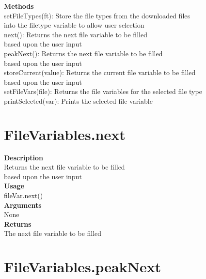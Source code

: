 \documentclass[11pt, oneside]{article}
\begin{document}
\noindent\textbf{Methods} \\
        setFileTypes(ft): Store the file types from the downloaded files\\
            into the filetype variable to allow user selection\\
        next(): Returns the next file variable to be filled\\
            based upon the user input\\
        peakNext(): Returns the next file variable to be filled\\
            based upon the user input\\
        storeCurrent(value): Returns the current file variable to be filled\\
            based upon the user input\\
        setFileVars(file): Returns the file variables for the selected file type\\
        printSelected(var): Prints the selected file variable\\


\section{FileVariables.next}

\textbf{Description} \\
        Returns the next file variable to be filled \\
        based upon the user input\\

\noindent\textbf{Usage} \\
        fileVar.next() \\

\noindent\textbf{Arguments} \\
        None\\

\noindent\textbf{Returns} \\
        The next file variable to be filled\\


\section{FileVariables.peakNext}
\end{document}
